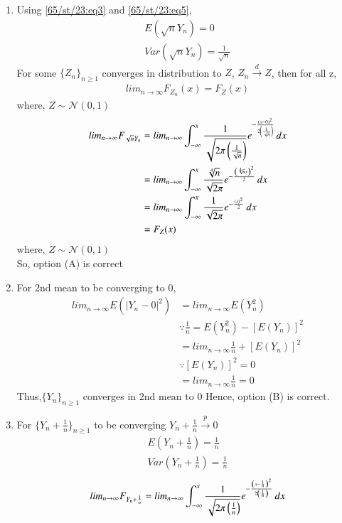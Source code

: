 \documentclass[journal,12pt,Twocolumn]{IEEEtran}
\theoremstyle{remark}
\begin{document}
\begin{enumerate}[label=(\Alph*)]
\item Using \eqref{65/st/23:eq3} and \eqref{65/st/23:eq5}, 
\begin{align}
E(\sqrt{n}Y_n)=0 \\
Var(\sqrt{n}Y_n)=\frac{1}{\sqrt{n}} 
\end{align}
For some $\{Z_n\}_{n \geq 1}$  converges in distribution to $Z$, $Z_n \xrightarrow{d} Z$, then for all z,
\begin{align}
lim_{n \to \infty} F_{Z_n}(x) = F_{Z}(x) 
\end{align}
where, $Z \sim \mathcal{N}(0,1)$
\begin{align}
lim_{n \to \infty} F_{\sqrt{n}Y_n} 
&= lim_{n \to \infty} \int_{-\infty}^{x} \frac{1}{\sqrt{2\pi\left(\frac{1}{\sqrt{n}}\right)}}e^{-\frac{\left(x-0\right)^2}{2\left(\frac{1}{\sqrt{n}}\right)}} \,dx \\
&= lim_{n \to \infty} \int_{-\infty}^{x} \frac{\sqrt[4]{n}}{\sqrt{2\pi}}e^{-\frac{\left(\sqrt[4]{n}x\right)^2}{2}} \,dx \\
&= lim_{n \to \infty} \int_{-\infty}^{x} \frac{1}{\sqrt{2\pi}}e^{-\frac{\left(x\right)^2}{2}} \,dx \\
&=F_Z(x)
\end{align}
where, $Z \sim \mathcal{N}(0,1)$ \\
So, option (A) is correct\
\item For 2nd mean to be converging to 0,
\begin{align}
lim_{n \to \infty} E(|Y_n-0|^2)&=lim_{n \to \infty} E(Y_n^2) \\
&\because \frac{1}{n} = E(Y_n^2) - [E(Y_n)]^2 \\
&=lim_{n \to \infty} \frac{1}{n} + [E(Y_n)]^2 \\
&\because [E(Y_n)]^2 = 0 \\
&=lim_{n \to \infty} \frac{1}{n} = 0 
\end{align}
Thus,$\{Y_n\}_{n \geq 1}$ converges in 2nd mean to 0
Hence, option (B) is correct.
\item For $\{Y_n+\frac{1}{n}\}_{n \geq 1}$ to be converging $Y_n +\frac{1}{n} \xrightarrow{p} 0$
\begin{align}
E(Y_n+\frac{1}{n}) = \frac{1}{n} \\
Var(Y_n+\frac{1}{n}) = \frac{1}{n}
\end{align}  
\begin{align}
lim_{n \to \infty} F_{Y_n+\frac{1}{n}} 
&= lim_{n \to \infty} \int_{-\infty}^{x} \frac{1}{\sqrt{2\pi\brak{\frac{1}{n}}}}e^{-\frac{\brak{x-\frac{1}{n}}^2}{2\brak{\frac{1}{n}}}} \,dx \\

\end{align}
\end{enumerate}
\end{document}
